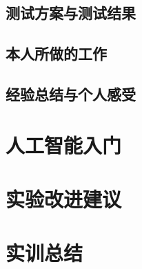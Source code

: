 \documentclass[a4paper,twoside,zihao=5,UTF8]{ctexart}
\begin{document}
\begin{spacing}{1.2}
\subsection{测试方案与测试结果}

\subsection{本人所做的工作}

\subsection{经验总结与个人感受}


\section{人工智能入门}


\section{实验改进建议}


\section{实训总结}


\end{spacing}
\end{document}
